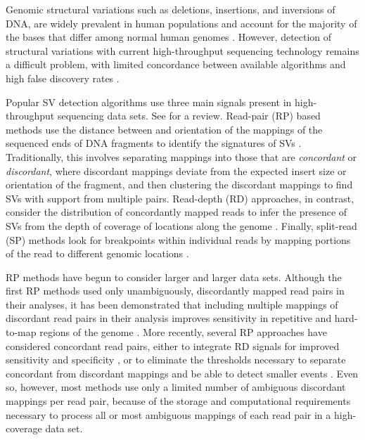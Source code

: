 \documentclass[11pt]{article}
\begin{document}
Genomic structural variations such as deletions, insertions, and inversions of DNA, are widely prevalent in human populations and account for the majority of the bases that differ among normal human genomes \autocite{Mills:2011p1611, Conrad:2010ja}. However, detection of structural variations with current high-throughput sequencing technology remains a difficult problem, with limited concordance between available algorithms and high false discovery rates \autocite{Mills:2011p1611}.

Popular SV detection algorithms use three main signals present in high-throughput sequencing data sets. See \textcite{Alkan:2011p547} for a review. Read-pair (RP) based methods use the distance between and orientation of the mappings of the sequenced ends of DNA fragments to identify the signatures of SVs \autocite{Campbell:2008p539,Chen:2009p3,Hormozdiari:2009p284,Sindi:2009gu,Korbel:2009dy}. Traditionally, this involves separating mappings into those that are \emph{concordant} or \emph{discordant}, where discordant mappings deviate from the expected insert size or orientation of the fragment, and then clustering the discordant mappings to find SVs with support from multiple pairs. Read-depth (RD) approaches, in contrast, consider the distribution of concordantly mapped reads to infer the presence of SVs from the depth of coverage of locations along the genome \autocite{Abyzov:2011bk,Alkan:2009cr,Yoon:2009kb,Chiang:2009di}. Finally, split-read (SP) methods look for breakpoints within individual reads by mapping portions of the read to different genomic locations \autocite{Wang:2011p1607,Ye:2009p2}.

RP methods have begun to consider larger and larger data sets. Although the first RP methods used only unambiguously, discordantly mapped read pairs in their analyses, it has been demonstrated that including multiple mappings of discordant read pairs in their analysis improves sensitivity in repetitive and hard-to-map regions of the genome \autocite{Hormozdiari:2009p284,Quinlan:2010gf}. More recently, several RP approaches have considered concordant read pairs, either to integrate RD signals for improved sensitivity and specificity \autocite{Sindi:2012kk,Michaelson:2012fj,Chiara:2012ey}, or to eliminate the thresholds necessary to separate concordant from discordant mappings and be able to detect smaller events \autocite{Marschall:2012ek}. Even so, however, most methods use only a limited number of ambiguous discordant mappings per read pair, because of the storage and computational requirements necessary to process all or most ambiguous mappings of each read pair in a high-coverage data set.
\end{document}
